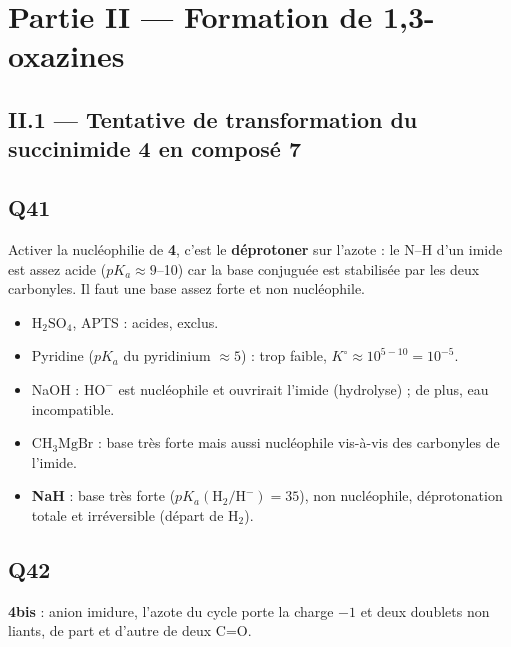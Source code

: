 \documentclass[11pt,a4paper]{article}
\providecommand{\tightlist}{\setlength{\itemsep}{0pt}\setlength{\parskip}{0pt}}
\newcommand{\equationajustee}[1]{%
  \sbox{\boiteequation}{$\displaystyle #1$}%
  \ifdim\wd\boiteequation>\linewidth
    \[\resizebox{\linewidth}{!}{\usebox{\boiteequation}}\]%
  \else
    \[#1\]%
  \fi}
\begin{document}
\hypertarget{partie-ii-formation-de-13-oxazines}{%
\section{Partie II --- Formation de 1,3-oxazines}\label{partie-ii-formation-de-13-oxazines}}

\hypertarget{ii.1-tentative-de-transformation-du-succinimide-4-en-composuxe9-7}{%
\subsection{II.1 --- Tentative de transformation du succinimide 4 en composé 7}\label{ii.1-tentative-de-transformation-du-succinimide-4-en-composuxe9-7}}

\hypertarget{q41}{%
\subsection{Q41}\label{q41}}

Activer la nucléophilie de \textbf{4}, c'est le \textbf{déprotoner} sur l'azote : le N--H d'un imide est assez acide (\(pK_a\approx9\)--10) car la base conjuguée est stabilisée par les deux carbonyles. Il faut une base assez forte et non nucléophile.

\begin{itemize}
\tightlist
\item
  \(\mathrm{H_2SO_4}\), APTS : acides, exclus.
\item
  Pyridine (\(pK_a\) du pyridinium \(\approx5\)) : trop faible, \(K^\circ\approx10^{5-10}=10^{-5}\).
\item
  NaOH : \(\mathrm{HO^-}\) est nucléophile et ouvrirait l'imide (hydrolyse) ; de plus, eau incompatible.
\item
  \(\mathrm{CH_3MgBr}\) : base très forte mais aussi nucléophile vis-à-vis des carbonyles de l'imide.
\item
  \textbf{NaH} : base très forte (\(pK_a(\mathrm{H_2/H^-})=35\)), non nucléophile, déprotonation totale et irréversible (départ de \(\mathrm{H_2}\)).
\end{itemize}

\equationajustee{\boxed{\mathbf{R1}=\mathrm{NaH}}}

\hypertarget{q42}{%
\subsection{Q42}\label{q42}}

\textbf{4bis} : anion imidure, l'azote du cycle porte la charge \(-1\) et deux doublets non liants, de part et d'autre de deux C=O.
\end{document}
